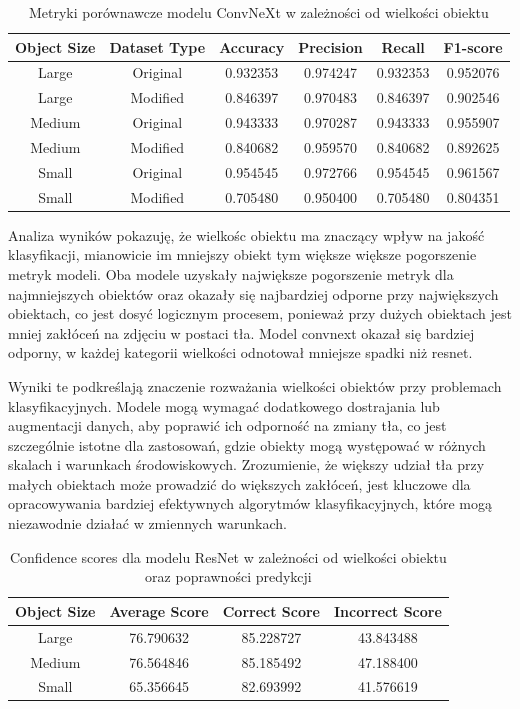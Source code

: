 \begin{table}
	\centering
	\begin{tabular}{|c|c|c|c|c|c|}
		\hline
		\textbf{Object Size} & \textbf{Dataset Type} & \textbf{Accuracy} & \textbf{Precision} & \textbf{Recall} & \textbf{F1-score} \\
		\hline
		Large & Original & 0.932353 & 0.974247 & 0.932353 & 0.952076 \\
		\hline
		Large & Modified & 0.846397 & 0.970483 & 0.846397 & 0.902546 \\
		\hline
		Medium & Original & 0.943333 & 0.970287 & 0.943333 & 0.955907 \\
		\hline
		Medium & Modified & 0.840682 & 0.959570 & 0.840682 & 0.892625 \\
		\hline
		Small & Original & 0.954545 & 0.972766 & 0.954545 & 0.961567 \\
		\hline
		Small & Modified & 0.705480 & 0.950400 & 0.705480 & 0.804351 \\
		\hline
	\end{tabular}
	\caption{Metryki porównawcze modelu ConvNeXt w zależności od wielkości obiektu}
	\label{tab:convnext_object_size_metrics}
\end{table}

Analiza wyników pokazuję, że wielkośc obiektu ma znaczący wpływ na jakość klasyfikacji, mianowicie im mniejszy obiekt tym większe większe pogorszenie metryk modeli. Oba modele uzyskały największe pogorszenie metryk dla najmniejszych obiektów oraz 
okazały się najbardziej odporne przy największych obiektach, co jest dosyć logicznym procesem, ponieważ przy dużych obiektach jest mniej zakłóceń na zdjęciu w postaci tła. Model convnext okazał się bardziej odporny, w każdej kategorii wielkości
odnotował mniejsze spadki niż resnet.


Wyniki te podkreślają znaczenie rozważania wielkości obiektów przy problemach klasyfikacyjnych. Modele mogą wymagać dodatkowego dostrajania lub augmentacji danych, aby poprawić ich odporność na zmiany tła, co jest 
szczególnie istotne dla zastosowań, gdzie obiekty mogą występować w różnych skalach i warunkach środowiskowych. Zrozumienie, że większy udział tła przy małych obiektach może prowadzić do większych zakłóceń, jest kluczowe dla opracowywania 
bardziej efektywnych algorytmów klasyfikacyjnych, które mogą niezawodnie działać w zmiennych warunkach.

\begin{table}
	\centering
	\begin{tabular}{|c|c|c|c|}
		\hline
		\textbf{Object Size} & \textbf{Average Score} & \textbf{Correct Score} & \textbf{Incorrect Score} \\
		\hline
		Large & 76.790632 & 85.228727 & 43.843488 \\
		\hline
		Medium & 76.564846 & 85.185492 & 47.188400 \\
		\hline
		Small & 65.356645 & 82.693992 & 41.576619 \\
		\hline
	\end{tabular}
	\caption{Confidence scores dla modelu ResNet w zależności od wielkości obiektu oraz poprawności predykcji}
	\label{tab:resnet_confidence_scores}
\end{table}

